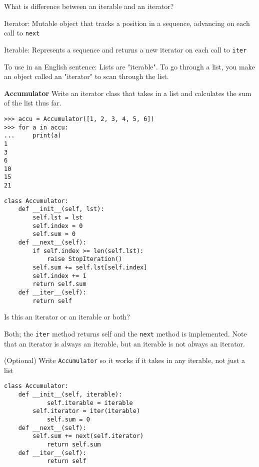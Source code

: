 \question What is difference between an iterable and an iterator?
\begin{solution}[0.5in]
Iterator: Mutable object that tracks a position in a sequence, advancing on each call to \texttt{next}

Iterable: Represents a sequence and returns a new iterator on each call to \texttt{iter}

To use in an English sentence:
Lists are "iterable". To go through a list, you make an object called an "iterator" to scan through the list.
\end{solution}

\question \textbf{Accumulator} Write an iterator class that takes in a list and calculates the sum of the list thus far.
\begin{lstlisting}
>>> accu = Accumulator([1, 2, 3, 4, 5, 6])
>>> for a in accu:
...     print(a)
1
3
6
10
15
21
\end{lstlisting}

\begin{solution}[1.5in]
\begin{lstlisting}
class Accumulator:
    def __init__(self, lst):
        self.lst = lst
        self.index = 0
        self.sum = 0
    def __next__(self):
        if self.index >= len(self.lst):
            raise StopIteration()
        self.sum += self.lst[self.index]
        self.index += 1
        return self.sum
    def __iter__(self):
        return self
\end{lstlisting}
\end{solution}

\question Is this an iterator or an iterable or both?
\begin{solution}[0.5in]
Both; the \texttt{iter} method returns self and the \texttt{next} method is
implemented. Note that an iterator is always an iterable, but an iterable is not
always an iterator.
\end{solution}

\question (Optional) Write \texttt{Accumulator} so it works if it takes in any
iterable, not just a list

\begin{solution}[1.5in]
\begin{lstlisting}
class Accumulator:
    def __init__(self, iterable):
            self.iterable = iterable
        self.iterator = iter(iterable)
            self.sum = 0
    def __next__(self):
        self.sum += next(self.iterator)
            return self.sum
    def __iter__(self):
            return self
\end{lstlisting}
\end{solution}
